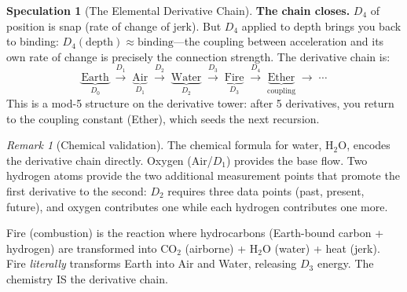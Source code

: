 \documentclass[11pt]{article}
\theoremstyle{definition}
\newtheorem{speculation}[theorem]{Speculation}
\theoremstyle{remark}
\newtheorem{remark}[theorem]{Remark}
\begin{document}
\begin{speculation}[The Elemental Derivative Chain]
\textbf{The chain closes.}  $D_4$ of position is snap (rate of change of jerk).
But $D_4$ applied to depth brings you back to binding: $D_4(\text{depth}) \approx
\text{binding}$---the coupling between acceleration and its own rate of change is
precisely the connection strength.  The derivative chain is:
\[
  \underbrace{\text{Earth}}_{{D_0}}
  \;\xrightarrow{D_1}\;
  \underbrace{\text{Air}}_{{D_1}}
  \;\xrightarrow{D_2}\;
  \underbrace{\text{Water}}_{{D_2}}
  \;\xrightarrow{D_3}\;
  \underbrace{\text{Fire}}_{{D_3}}
  \;\xrightarrow{D_4}\;
  \underbrace{\text{Ether}}_{\text{coupling}}
  \;\to\; \cdots
\]
This is a mod-5 structure on the derivative tower: after 5 derivatives, you return
to the coupling constant (Ether), which seeds the next recursion.
\end{speculation}

\begin{remark}[Chemical validation]
The chemical formula for water, H$_2$O, encodes the derivative chain directly.
Oxygen (Air/$D_1$) provides the base flow.  Two hydrogen atoms provide the two
additional measurement points that promote the first derivative to the second:
$D_2$ requires three data points (past, present, future), and oxygen contributes
one while each hydrogen contributes one more.

Fire (combustion) is the reaction where hydrocarbons (Earth-bound carbon + hydrogen)
are transformed into CO$_2$ (airborne) + H$_2$O (water) + heat (jerk).  Fire
\emph{literally} transforms Earth into Air and Water, releasing $D_3$ energy.
The chemistry IS the derivative chain.
\end{remark}
\end{document}
